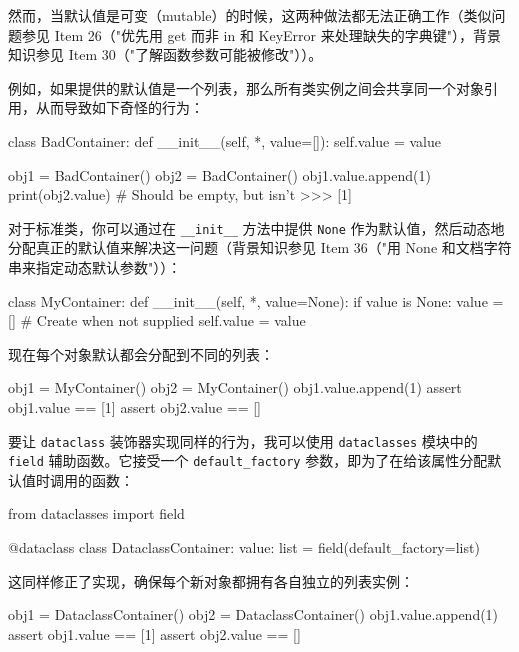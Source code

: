 然而，当默认值是可变（mutable）的时候，这两种做法都无法正确工作（类似问题参见 Item 26（"优先用 get 而非 in 和 KeyError 来处理缺失的字典键"），背景知识参见 Item 30（"了解函数参数可能被修改"））。

例如，如果提供的默认值是一个列表，那么所有类实例之间会共享同一个对象引用，从而导致如下奇怪的行为：

\begin{codebox}[python]
class BadContainer:
    def __init__(self, *, value=[]):
        self.value = value

obj1 = BadContainer()
obj2 = BadContainer()
obj1.value.append(1)
print(obj2.value)  # Should be empty, but isn't
>>>
[1]
\end{codebox}

对于标准类，你可以通过在 \texttt{\_\_init\_\_} 方法中提供 \texttt{None} 作为默认值，然后动态地分配真正的默认值来解决这一问题（背景知识参见 Item 36（"用 None 和文档字符串来指定动态默认参数"））：

\begin{codebox}[python]
class MyContainer:
    def __init__(self, *, value=None):
        if value is None:
            value = []  # Create when not supplied
        self.value = value
\end{codebox}

现在每个对象默认都会分配到不同的列表：

\begin{codebox}[python]
obj1 = MyContainer()
obj2 = MyContainer()
obj1.value.append(1)
assert obj1.value == [1]
assert obj2.value == []
\end{codebox}

要让 \texttt{dataclass} 装饰器实现同样的行为，我可以使用 \texttt{dataclasses} 模块中的 \texttt{field} 辅助函数。它接受一个 \texttt{default\_factory} 参数，即为了在给该属性分配默认值时调用的函数：

\begin{codebox}[python]
from dataclasses import field

@dataclass
class DataclassContainer:
    value: list = field(default_factory=list)
\end{codebox}

这同样修正了实现，确保每个新对象都拥有各自独立的列表实例：

\begin{codebox}[python]
obj1 = DataclassContainer()
obj2 = DataclassContainer()
obj1.value.append(1)
assert obj1.value == [1]
assert obj2.value == []
\end{codebox}

